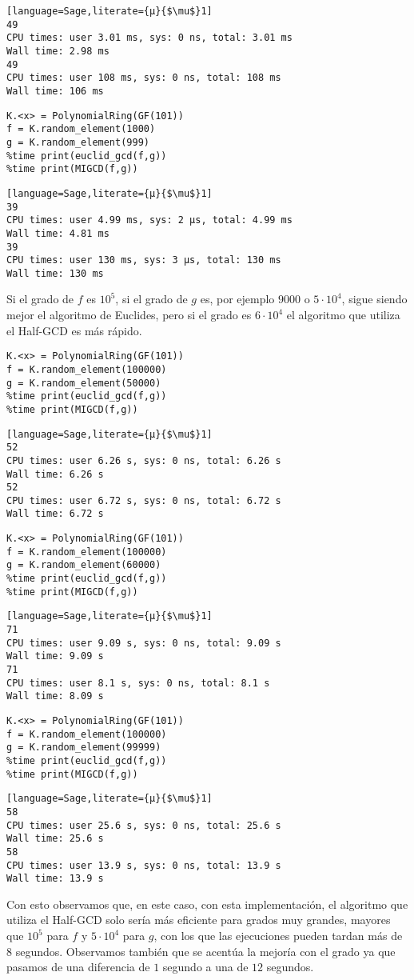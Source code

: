 \documentclass[10pt]{article}
\theoremstyle{definition}
\begin{document}
\begin{lstlisting}[language=Sage,literate={µ}{$\mu$}1]
49
CPU times: user 3.01 ms, sys: 0 ns, total: 3.01 ms
Wall time: 2.98 ms
49
CPU times: user 108 ms, sys: 0 ns, total: 108 ms
Wall time: 106 ms
\end{lstlisting}
\begin{lstlisting}[language=Sage]
K.<x> = PolynomialRing(GF(101))
f = K.random_element(1000)
g = K.random_element(999)
%time print(euclid_gcd(f,g))
%time print(MIGCD(f,g))
\end{lstlisting}
\begin{lstlisting}[language=Sage,literate={µ}{$\mu$}1]
39
CPU times: user 4.99 ms, sys: 2 µs, total: 4.99 ms
Wall time: 4.81 ms
39
CPU times: user 130 ms, sys: 3 µs, total: 130 ms
Wall time: 130 ms
\end{lstlisting}
Si el grado de $f$ es $10^5$, si el grado de $g$ es, por ejemplo $9000$ o $5\cdot 10^4$, sigue siendo mejor el algoritmo de Euclides, pero si el grado es $6\cdot 10^4$ el algoritmo que utiliza el Half-GCD es más rápido.
\begin{lstlisting}[language=Sage]
K.<x> = PolynomialRing(GF(101))
f = K.random_element(100000)
g = K.random_element(50000)
%time print(euclid_gcd(f,g))
%time print(MIGCD(f,g))
\end{lstlisting}
\begin{lstlisting}[language=Sage,literate={µ}{$\mu$}1]
52
CPU times: user 6.26 s, sys: 0 ns, total: 6.26 s
Wall time: 6.26 s
52
CPU times: user 6.72 s, sys: 0 ns, total: 6.72 s
Wall time: 6.72 s
\end{lstlisting}
\begin{lstlisting}[language=Sage]
K.<x> = PolynomialRing(GF(101))
f = K.random_element(100000)
g = K.random_element(60000)
%time print(euclid_gcd(f,g))
%time print(MIGCD(f,g))
\end{lstlisting}
\begin{lstlisting}[language=Sage,literate={µ}{$\mu$}1]
71
CPU times: user 9.09 s, sys: 0 ns, total: 9.09 s
Wall time: 9.09 s
71
CPU times: user 8.1 s, sys: 0 ns, total: 8.1 s
Wall time: 8.09 s
\end{lstlisting}
\begin{lstlisting}[language=Sage]
K.<x> = PolynomialRing(GF(101))
f = K.random_element(100000)
g = K.random_element(99999)
%time print(euclid_gcd(f,g))
%time print(MIGCD(f,g))
\end{lstlisting}
\begin{lstlisting}[language=Sage,literate={µ}{$\mu$}1]
58
CPU times: user 25.6 s, sys: 0 ns, total: 25.6 s
Wall time: 25.6 s
58
CPU times: user 13.9 s, sys: 0 ns, total: 13.9 s
Wall time: 13.9 s
\end{lstlisting}
Con esto observamos que, en este caso, con esta implementación, el algoritmo que utiliza el Half-GCD solo sería más eficiente para grados muy grandes, mayores que $10^5$ para $f$ y $5\cdot 10^4$ para $g$, con los que las ejecuciones pueden tardan más de 8 segundos. Observamos también que se acentúa la mejoría con el grado ya que pasamos de una diferencia de $1$ segundo a una de $12$ segundos.
\end{document}
